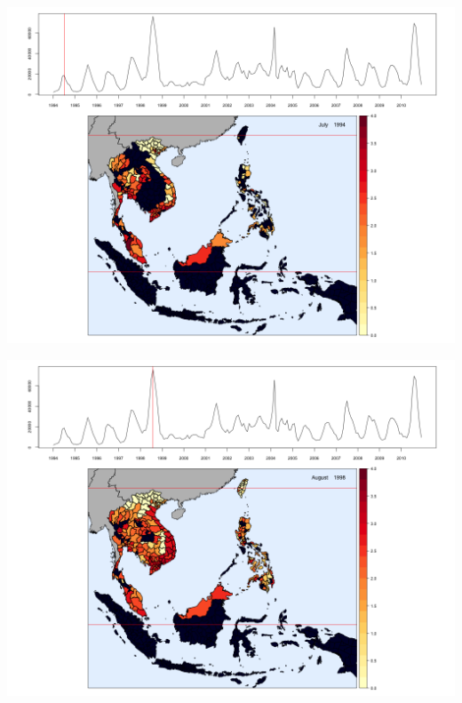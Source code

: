 \begin{center}
\begin{minipage}{0.5\textwidth}
\includegraphics[width=\linewidth]{../figures/chap2/Test7.png}
\label{fig2a}
\end{minipage}\hfill
\begin{minipage}{0.5\textwidth}
\includegraphics[width=\linewidth]{../figures/chap2/Test56.png} 
\label{fig2b}
\end{minipage}
\begin{minipage}{0.5\textwidth}

\end{minipage}
\end{center}
